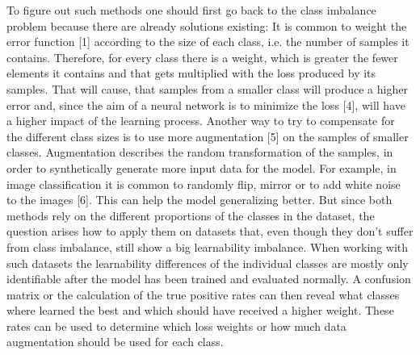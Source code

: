 \documentclass[journal]{IEEEtran}
\begin{document}
To figure out such methods one should first go back to the class imbalance problem because there are already solutions existing:
It is common to weight the error function [1] according to the size of each class, i.e. the number of samples it contains.
Therefore, for every class there is a weight, which is greater the fewer elements it contains and that gets multiplied with the loss produced by its samples. %
That will cause, that samples from a smaller class will produce a higher error and, since the aim of a neural network is to minimize the loss [4], will have a higher impact of the learning process.
Another way to try to compensate for the different class sizes is to use more augmentation [5] on the samples of smaller classes. 
Augmentation describes the random transformation of the samples, in order to synthetically generate more input data for the model. For example, in image classification it is common to randomly flip, mirror or to add white noise to the images [6].
This can help the model generalizing better.
But since both methods rely on the different proportions of the classes in the dataset, the question arises how to apply them on datasets that, even though they don't suffer from class imbalance, still show a big learnability imbalance.
When working with such datasets the learnability differences of the individual classes are mostly only identifiable after the model has been trained and evaluated normally. 
A confusion matrix or the calculation of the true positive rates can then reveal what classes where learned the best and which should have received a higher weight. 
These rates can be used to determine which loss weights or how much data augmentation should be used for each class.
\end{document}
